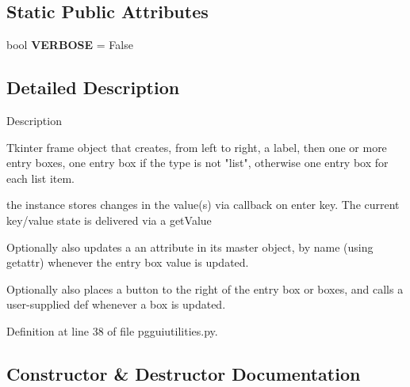 \subsection*{Static Public Attributes}
\begin{DoxyCompactItemize}
\item 
bool {\bfseries V\+E\+R\+B\+O\+SE} = False\hypertarget{classnegui_1_1pgguiutilities_1_1KeyValFrame_a7ab96ae24edc45cf94f7cf10bc412557}{}\label{classnegui_1_1pgguiutilities_1_1KeyValFrame_a7ab96ae24edc45cf94f7cf10bc412557}

\end{DoxyCompactItemize}


\subsection{Detailed Description}
\begin{DoxyVerb}Description

Tkinter frame object that creates,
from left to right, a label, then 
one or more entry boxes, one entry box 
if the type is not "list", otherwise one 
entry box for each list item.

the instance stores changes in the value(s)
via callback on enter key.  The current
key/value state is delivered via a getValue

Optionally also updates a an attribute
in its master object, by name (using getattr)
whenever the entry box value is updated.

Optionally also places a button to the right
of the entry box or boxes, and calls a user-supplied
def whenever a box is updated.\end{DoxyVerb}
 

Definition at line 38 of file pgguiutilities.\+py.



\subsection{Constructor \& Destructor Documentation}
